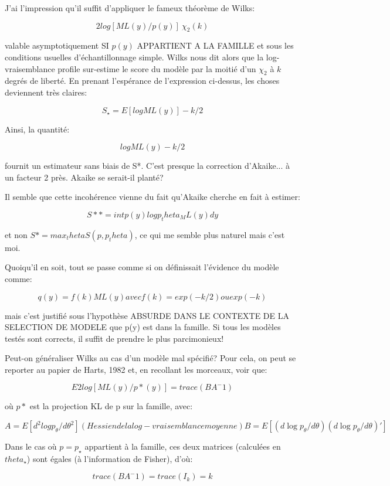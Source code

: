 \documentclass{article}
\begin{document}
J'ai l'impression qu'il suffit d'appliquer le fameux th\'eor\`eme de Wilks: 

$$2 log [ML(y) / p(y)] ~ \chi_2(k)$$ 

valable asymptotiquement SI $p(y)$ APPARTIENT A LA FAMILLE et sous les conditions usuelles d'\'echantillonnage simple. Wilks nous dit alors que la log-vraisemblance profile sur-estime le score du mod\`ele par la moiti\'e d'un $\chi_2$ \`a $k$ degr\'es de libert\'e. En prenant l'esp\'erance de l'expression ci-dessus, les choses deviennent tr\`es claires: 

$$S_\star = E[log ML(y)] - k/2$$ 

Ainsi, la quantit\'e: 

$$log ML(y) - k/2$$ 

fournit un estimateur sans biais de S*. C'est presque la correction d'Akaike... \`a un facteur 2 pr\`es. Akaike se serait-il plant\'e? 

Il semble que cette incoh\'erence vienne du fait qu'Akaike cherche en fait \`a estimer: 

$$S** = int p(y) log p_theta_ML(y) dy$$ 

et non $S* = max_theta S(p, p_theta)$, ce qui me semble plus naturel mais c'est moi. 

Quoiqu'il en soit, tout se passe comme si on d\'efinissait l'\'evidence du mod\`ele comme: 

$$q(y) = f(k) ML(y) avec f(k) = exp(-k/2) ou exp(-k)$$ 

mais c'est justifi\'e sous l'hypoth\`ese ABSURDE DANS LE CONTEXTE DE LA SELECTION DE MODELE que p(y) est dans la famille. Si tous les mod\`eles test\'es sont corrects, il suffit de prendre le plus parcimonieux! 

Peut-on g\'en\'eraliser Wilks au cas d'un mod\`ele mal sp\'ecifi\'e? Pour cela, on peut se reporter au papier de Harts, 1982 et, en recollant les morceaux, voir que: 

$$E {2 log [ML(y) / p*(y)]} = trace(B A^-1)$$ 

o\`u $p*$ est la projection KL de p sur la famille, avec: 

$$A = E[ d^2 log p_\theta / d\theta^2 ] (Hessien de la log-vraisemblance moyenne) B = E[ (d\log p_\theta / d\theta) (d\log p_\theta / d\theta)' ]$$ 

Dans le cas o\`u $p=p_\star$ appartient \`a la famille, ces deux matrices (calcul\'ees en $theta_\star$) sont \'egales (\`a l'information de Fisher), d'o\`u: 

$$trace(B A^-1) = trace(I_k) = k$$ 
\end{document}
